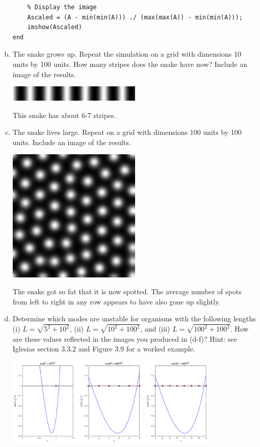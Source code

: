 \documentclass{article}
\begin{document}
\begin{enumerate}[a)]
\begin{lstlisting}
    % Display the image
    Ascaled = (A - min(min(A))) ./ (max(max(A)) - min(min(A)));
    imshow(Ascaled)
end
\end{lstlisting}

\item The snake grows up. Repeat the simulation on a grid with dimensions 10 units by 100 units. How many stripes does the snake have now? Include an image of the results.

\begin{center}
\includegraphics[width=0.5\textwidth]{prob2e.pdf}
\end{center}

{\color{red}
This snake has about 6-7 stripes.
}

\item The snake lives large. Repeat on a grid with dimensions 100 units by 100 units. Include an image of the results.

\begin{center}
\includegraphics[width=0.5\textwidth]{prob2f.pdf}
\end{center}

{\color{red}
The snake got so fat that it is now spotted. The average number of spots from left to right in any row appears to have also gone up slightly.
}

\item Determine which modes are unstable for organisms with the following lengths (i) $L=\sqrt{5^2 + 10^2}$, (ii) $L=\sqrt{10^2 + 100^2}$, and (iii) $L=\sqrt{100^2 + 100^2}$. How are these values reflected in the images you produced in (d-f)? Hint: see Iglesias section 3.3.2 and Figure 3.9 for a worked example.

\begin{center}
\includegraphics[width=0.8\textwidth]{unstable_nodes.pdf}
\end{center}


\end{enumerate}
\end{document}
